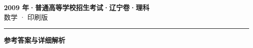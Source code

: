 \documentclass[zihao=5, a4paper]{ctexart}
\begin{document}
\begin{center}
  {\Large\bfseries 2009 年·普通高等学校招生考试·辽宁卷·理科}\\[4pt]
  {\large 数学 · 印刷版}
\end{center}
\medskip
{}

\par\bigskip\hrule\bigskip
{}
\begin{center}{\large\bfseries 参考答案与详细解析}\end{center}
\smallskip

\end{document}
